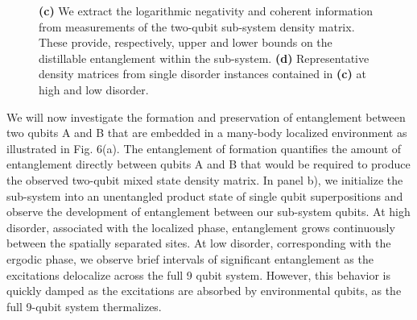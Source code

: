 \begin{figure}[tb!]
{        \textbf{(c)} 
        We extract the logarithmic negativity and coherent information from measurements of the two-qubit sub-system density matrix.
        These provide, respectively, upper and lower bounds on the distillable entanglement within the sub-system.
        \textbf{(d)} Representative density matrices from single disorder instances contained in \textbf{(c)} at high and low disorder.
        }
        \label{fig_5}
\end{figure}
\afterpage{\FloatBarrier}

We will now investigate the formation and preservation of entanglement between two qubits A and B that are embedded in a many-body localized environment as illustrated in Fig. 6(a).
The entanglement of formation quantifies the amount of entanglement directly between qubits A and B that would be required to produce the observed two-qubit mixed state density matrix.\autocite{Wootters1998}
In panel b), we initialize the sub-system into an unentangled product state of single qubit superpositions and observe the development of entanglement between our sub-system qubits.
At high disorder, associated with the localized phase, entanglement grows continuously between the spatially separated sites.
At low disorder, corresponding with the ergodic phase, we observe brief intervals of significant entanglement as the excitations delocalize across the full 9 qubit system.
However, this behavior is quickly damped as the excitations are absorbed by environmental qubits, as the full 9-qubit system thermalizes.

